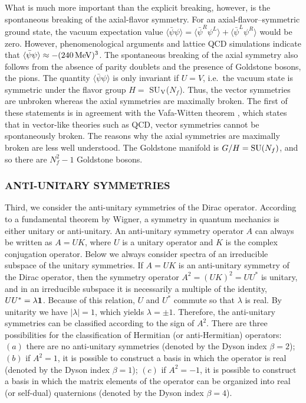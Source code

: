 What is much more important than the explicit breaking, however, is
the spontaneous breaking of the axial-flavor symmetry.  For an
axial-flavor--symmetric ground state, the vacuum expectation value
$\langle\bar\psi\psi\rangle=
\langle\bar\psi^R\psi^L\rangle+\langle\bar\psi^L\psi^R\rangle$ would
be zero.  However, phenomenological arguments and lattice QCD
simulations indicate that $\langle\bar\psi\psi\rangle\approx
-(240\,{\rm MeV})^3$.  The spontaneous breaking of the axial symmetry
also follows from the absence of parity doublets and the presence of
Goldstone bosons, the pions.  The quantity
$\langle\bar\psi\psi\rangle$ is only invariant if $U=V$, i.e.\ the
vacuum state is symmetric under the flavor group $H=$ SU$_{\rm V}$($N_f$).
Thus, the vector symmetries are unbroken whereas the axial symmetries
are maximally broken.  The first of these statements is in agreement
with the Vafa-Witten theorem \cite{Vafa84}, which states that in
vector-like theories such as QCD, vector symmetries cannot be
spontaneously broken.  The reasons why the axial symmetries are
maximally broken \cite{peskin} are less well understood.  The
Goldstone manifold is $G/H={\rm SU}(N_f)$, and so there are $N_f^2-1$
Goldstone bosons.

\subsubsection{ANTI-UNITARY SYMMETRIES}
\label{anti-unitary} 

Third, we consider the anti-unitary symmetries of the Dirac operator.
According to a fundamental theorem by Wigner, a symmetry in quantum
mechanics is either unitary or anti-unitary.  An anti-unitary symmetry
operator $A$ can always be written as $A=UK$, where $U$ is a unitary
operator and $K$ is the complex conjugation operator. Below we always
consider spectra of an irreducible subspace of the unitary symmetries.
If $A=UK$ is an anti-unitary symmetry of the Dirac operator, then the
symmetry operator $A^2=(UK)^2=UU^*$ is unitary, and in an irreducible
subspace it is necessarily a multiple of the identity, $UU^* = \lambda
{\bf 1}$.  Because of this relation, $U$ and $U^*$ commute so that
$\lambda$ is real. By unitarity we have $|\lambda| = 1$, which yields
$\lambda=\pm1$.  Therefore, the anti-unitary symmetries can be
classified according to the sign of $A^2$. There are three possibilities
for the classification of Hermitian (or
anti-Hermitian) operators: $(a)$ there are no anti-unitary symmetries
(denoted by the Dyson index $\beta =2$); $(b)$ if $A^2 = 1$, it is
possible to construct a basis in which the operator is real (denoted
by the Dyson index $\beta =1$); $(c)$ if $A^2 = -1$, it is possible
to construct a basis in which the matrix elements of the operator can
be organized into real (or self-dual) quaternions (denoted by the
Dyson index $\beta=4$).


